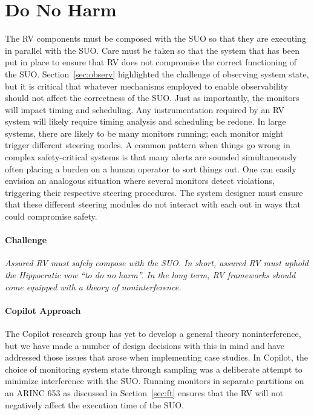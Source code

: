 \section{Do No Harm} \label{sec:noninter} The RV components must be
composed with the SUO so that they are executing in parallel with the
SUO.  Care must be taken so that the system that has been put in place
to ensure that RV does not compromise the correct functioning of the
SUO.  Section~\ref{sec:observ} highlighted the challenge of observing
system state, but it is critical that whatever mechanisms employed to
enable observability should not affect the correctness of the SUO.
Just as importantly, the monitors will impact timing and
scheduling. Any instrumentation required by an RV system will likely
require timing analysis and scheduling be redone. In large systems,
there are likely to be many monitors running; each monitor might
trigger different steering modes. A common pattern when things go
wrong in complex safety-critical systems is that many alerts are
sounded simultaneously often placing a burden on a human operator to
sort things out.  One can easily envision an analogous situation where
several monitors detect violations, triggering their respective
steering procedures. The system designer must ensure that these
different steering modules do not interact with each out in ways that
could compromise safety.

\paragraph{Challenge} \emph{Assured RV must safely compose with the
  SUO. In short, assured RV must uphold the Hippocratic vow ``to do no
  harm''.  In the long term, RV frameworks should come equipped with a
  theory of noninterference.}

\paragraph{Copilot Approach}  
The Copilot research group has yet to develop a general theory
noninterference, but we have made a number of design decisions with
this in mind and have addressed those issues that arose when
implementing case studies.  In Copilot, the choice of monitoring
system state through sampling was a deliberate attempt to minimize
interference with the SUO. Running monitors in separate partitions on
an ARINC 653 as discussed in Section~\ref{sec:ft} ensures that the RV
will not negatively affect the execution time of the SUO.



